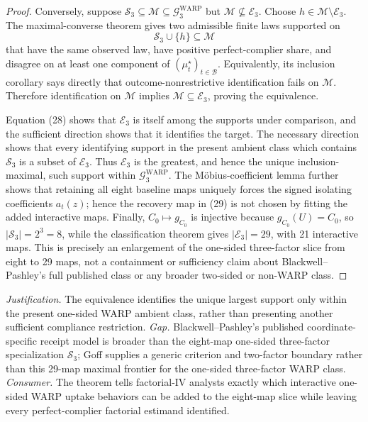 \documentclass{article}
\begin{document}
\begin{proof}
Conversely, suppose \(\mathcal S_3\subseteq\mathcal M\subseteq\mathcal G^{\mathrm{WARP}}_3\) but \(\mathcal M\not\subseteq\mathcal E_3\).  Choose \(h\in\mathcal M\setminus\mathcal E_3\).  The maximal-converse theorem gives two admissible finite laws supported on
\[
\mathcal S_3\cup\{h\}\subseteq\mathcal M
\]
that have the same observed law, have positive perfect-complier share, and disagree on at least one component of \((\mu_t^\star)_{t\in\mathcal B}\).  Equivalently, its inclusion corollary says directly that outcome-nonrestrictive identification fails on \(\mathcal M\).  Therefore identification on \(\mathcal M\) implies \(\mathcal M\subseteq\mathcal E_3\), proving the equivalence.

Equation (28) shows that \(\mathcal E_3\) is itself among the supports under comparison, and the sufficient direction shows that it identifies the target.  The necessary direction shows that every identifying support in the present ambient class which contains \(\mathcal S_3\) is a subset of \(\mathcal E_3\).  Thus \(\mathcal E_3\) is the greatest, and hence the unique inclusion-maximal, such support within \(\mathcal G^{\mathrm{WARP}}_3\).  The Möbius-coefficient lemma further shows that retaining all eight baseline maps uniquely forces the signed isolating coefficients \(a_t(z)\); hence the recovery map in (29) is not chosen by fitting the added interactive maps.  Finally, \(C_0\mapsto g_{C_0}\) is injective because \(g_{C_0}(U)=C_0\), so \(|\mathcal S_3|=2^3=8\), while the classification theorem gives \(|\mathcal E_3|=29\), with 21 interactive maps.  This is precisely an enlargement of the one-sided three-factor slice from eight to 29 maps, not a containment or sufficiency claim about Blackwell--Pashley's full published class or any broader two-sided or non-WARP class.
\end{proof}
\par\smallskip\noindent \textit{Justification.} The equivalence identifies the unique largest support only within the present one-sided WARP ambient class, rather than presenting another sufficient compliance restriction. \textit{Gap.} Blackwell--Pashley's published coordinate-specific receipt model is broader than the eight-map one-sided three-factor specialization \(\mathcal S_3\); Goff supplies a generic criterion and two-factor boundary rather than this 29-map maximal frontier for the one-sided three-factor WARP class. \textit{Consumer.} The theorem tells factorial-IV analysts exactly which interactive one-sided WARP uptake behaviors can be added to the eight-map slice while leaving every perfect-complier factorial estimand identified.
\end{document}
